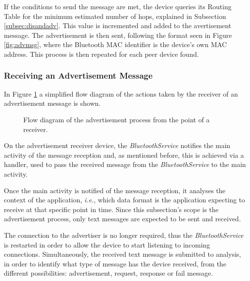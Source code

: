 If the conditions to send the message are met, the device queries its Routing Table for the minimum estimated number of hops, explained in Subsection \ref{subsec:disandadv}. This value is incremented and added to the avertisement message. The advertisement is then sent, following the format seen in Figure \ref{fig:advmsg}, where the Bluetooth \gls{MAC} identifier is the device's own \gls{MAC} address. This process is then repeated for each peer device found.

\subsubsection{Receiving an Advertisement Message}
\label{subsubsec:rcvadv}

In Figure \ref{fig:recvadvflux} a simplified flow diagram of the actions taken by the receiver of an advertisement message is shown.

\begin{figure}[ht]
	\noindent{}
	\caption{\label{fig:recvadvflux} Flow diagram of the advertisement process from the point of a receiver.}
\end{figure}

On the advertisement receiver device, the \textit{BluetoothService} notifies the main activity of the message reception and, as mentioned before, this is achieved via a handler, used to pass the received message from the \textit{BluetoothService} to the main activity.

Once the main activity is notified of the message reception, it analyses the context of the application, \textit{i.e.}, which data format is the application expecting to receive at that specific point in time. Since this subsection's scope is the advertisement process, only text messages are expected to be sent and received.

The connection to the advertiser is no longer required, thus the \textit{BluetoothService} is restarted in order to allow the device to start listening to incoming connections. Simultaneously, the received text message is submitted to analysis, in order to identify what type of message has the device received, from the different possibilities: advertisement, request, response or fail message.

